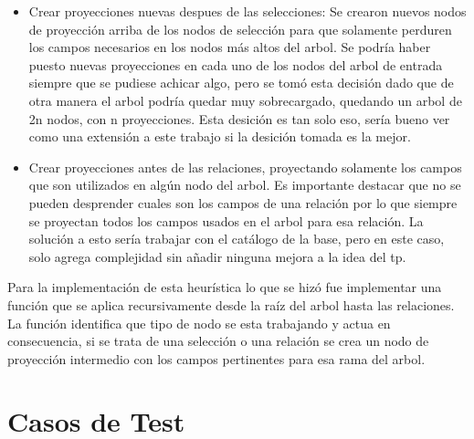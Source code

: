 \documentclass[a4paper,11pt]{article}
\begin{document}
\begin{itemize}
 \item Crear proyecciones nuevas despues de las selecciones: Se crearon nuevos nodos de proyecci\'on arriba de los nodos de selecci\'on para que solamente perduren los campos necesarios en los nodos m\'as altos del arbol. Se podr\'ia haber puesto nuevas proyecciones en cada uno de los nodos del arbol de entrada siempre que se pudiese achicar algo, pero se tom\'o esta decisi\'on dado que de otra manera el arbol podr\'ia quedar muy sobrecargado, quedando un arbol de 2n nodos, con n proyecciones. Esta desici\'on es tan solo eso, ser\'ia bueno ver como una extensi\'on a este trabajo si la desici\'on tomada es la mejor.

\item Crear proyecciones antes de las relaciones, proyectando solamente los campos que son utilizados en alg\'un nodo del arbol. Es importante destacar que no se pueden desprender cuales son los campos de una relaci\'on por lo que siempre se proyectan todos los campos usados en el arbol para esa relaci\'on. La soluci\'on a esto ser\'ia trabajar con el cat\'alogo de la base, pero en este caso, solo agrega complejidad sin añadir ninguna mejora a la idea del tp.

\end{itemize}

Para la implementaci\'on de esta heur\'istica lo que se hiz\'o fue implementar una funci\'on que se aplica recursivamente desde la ra\'iz del arbol hasta las relaciones. La funci\'on identifica que tipo de nodo se esta trabajando y actua en consecuencia, si se trata de una selecci\'on o una relaci\'on se crea un nodo de proyecci\'on intermedio con los campos pertinentes para esa rama del arbol.




\section{Casos de Test}
\end{document}
